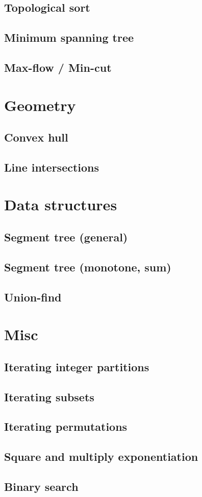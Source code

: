 \documentclass[a4paper,10pt]{article}
\begin{document}
\subsection{Topological sort}
\subsection{Minimum spanning tree}
\subsection{Max-flow / Min-cut}


\section{Geometry}
\subsection{Convex hull}

\subsection{Line intersections}
\section{Data structures}
\subsection{Segment tree (general)}
%
\subsection{Segment tree (monotone, sum)}

\subsection{Union-find}

\section{Misc}
\subsection{Iterating integer partitions}
\subsection{Iterating subsets}

\subsection{Iterating permutations}

\subsection{Square and multiply exponentiation}
\subsection{Binary search}
\end{document}
